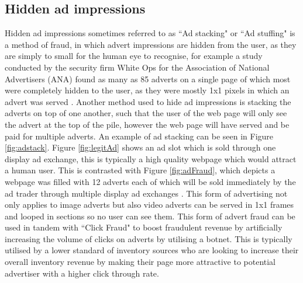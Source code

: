 \documentclass[12pt]{article}
\begin{document}
\subsection{Hidden ad impressions}
Hidden ad impressions sometimes referred to as ``Ad stacking" or ``Ad stuffing" is a method of fraud, in which advert impressions are hidden from the user, as they are simply to small for the human eye to recognise, for example a study conducted by the security firm White Ops for the Association of National Advertisers (ANA) found as many as 85 adverts on a single page of which most were completely hidden to the user, as they were mostly 1x1 pixels in which an advert was served \parencite{botfraud2015}. Another method used to hide ad impressions is stacking the adverts on top of one another, such that the user of the web page will only see the advert at the top of the pile, however the web page will have served and be paid for multiple adverts. An example of ad stacking can be seen in Figure \ref{fig:adstack}. Figure \ref{fig:legitAd} shows an ad slot which is sold through one display ad exchange, this is typically a high quality webpage which would attract a human user. This is contrasted with Figure \ref{fig:adFraud}, which depicts a webpage was filled with 12 adverts each of which will be sold immediately by the ad trader through multiple display ad exchanges \parencite{spiderIo}. This form of advertising not only applies to image adverts but also video adverts can be served in 1x1 frames and looped in sections so no user can see them. This form of advert fraud can be used in tandem with ``Click Fraud" to boost fraudulent revenue by artificially increasing the volume of clicks on adverts by utilising a botnet. This is typically utilised by a lower standard of inventory sources who are looking to increase their overall inventory revenue by making their page more attractive to potential advertiser with a higher click through rate.   \\
\end{document}
